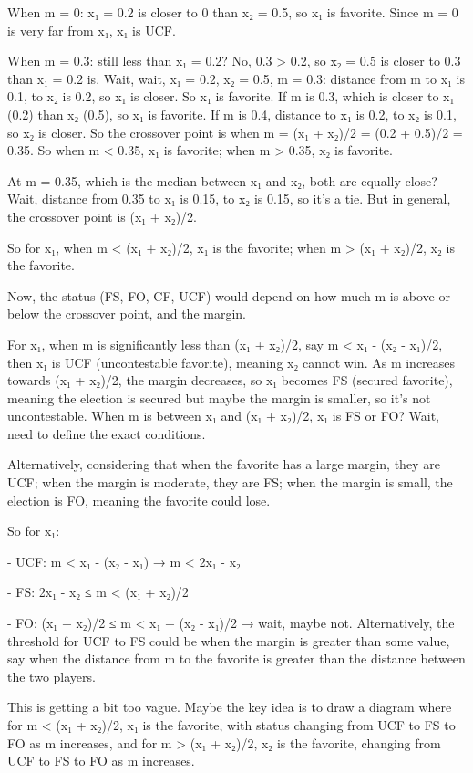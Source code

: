 When m = 0: x₁ = 0.2 is closer to 0 than x₂ = 0.5, so x₁ is favorite. Since m = 0 is very far from x₁, x₁ is UCF.

When m = 0.3: still less than x₁ = 0.2? No, 0.3 > 0.2, so x₂ = 0.5 is closer to 0.3 than x₁ = 0.2 is. Wait, wait, x₁ = 0.2, x₂ = 0.5, m = 0.3: distance from m to x₁ is 0.1, to x₂ is 0.2, so x₁ is closer. So x₁ is favorite. If m is 0.3, which is closer to x₁ (0.2) than x₂ (0.5), so x₁ is favorite. If m is 0.4, distance to x₁ is 0.2, to x₂ is 0.1, so x₂ is closer. So the crossover point is when m = (x₁ + x₂)/2 = (0.2 + 0.5)/2 = 0.35. So when m < 0.35, x₁ is favorite; when m > 0.35, x₂ is favorite. 

At m = 0.35, which is the median between x₁ and x₂, both are equally close? Wait, distance from 0.35 to x₁ is 0.15, to x₂ is 0.15, so it's a tie. But in general, the crossover point is (x₁ + x₂)/2. 

So for x₁, when m < (x₁ + x₂)/2, x₁ is the favorite; when m > (x₁ + x₂)/2, x₂ is the favorite. 

Now, the status (FS, FO, CF, UCF) would depend on how much m is above or below the crossover point, and the margin. 

For x₁, when m is significantly less than (x₁ + x₂)/2, say m < x₁ - (x₂ - x₁)/2, then x₁ is UCF (uncontestable favorite), meaning x₂ cannot win. As m increases towards (x₁ + x₂)/2, the margin decreases, so x₁ becomes FS (secured favorite), meaning the election is secured but maybe the margin is smaller, so it's not uncontestable. When m is between x₁ and (x₁ + x₂)/2, x₁ is FS or FO? Wait, need to define the exact conditions. 

Alternatively, considering that when the favorite has a large margin, they are UCF; when the margin is moderate, they are FS; when the margin is small, the election is FO, meaning the favorite could lose. 

So for x₁:

- UCF: m < x₁ - (x₂ - x₁) → m < 2x₁ - x₂

- FS: 2x₁ - x₂ ≤ m < (x₁ + x₂)/2

- FO: (x₁ + x₂)/2 ≤ m < x₁ + (x₂ - x₁)/2 → wait, maybe not. Alternatively, the threshold for UCF to FS could be when the margin is greater than some value, say when the distance from m to the favorite is greater than the distance between the two players. 

This is getting a bit too vague. Maybe the key idea is to draw a diagram where for m < (x₁ + x₂)/2, x₁ is the favorite, with status changing from UCF to FS to FO as m increases, and for m > (x₁ + x₂)/2, x₂ is the favorite, changing from UCF to FS to FO as m increases. 

